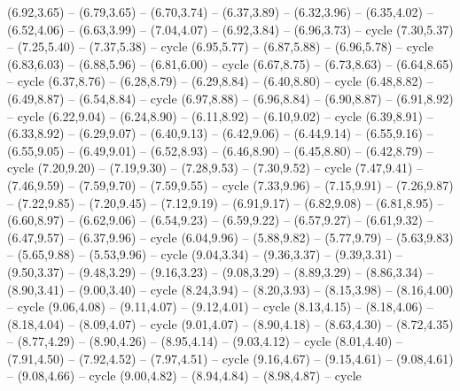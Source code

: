 {  (6.92,3.65) -- (6.79,3.65) -- (6.70,3.74) -- (6.37,3.89) -- (6.32,3.96) -- (6.35,4.02) -- (6.52,4.06) -- (6.63,3.99) -- (7.04,4.07) -- (6.92,3.84) -- (6.96,3.73) -- cycle
  (7.30,5.37) -- (7.25,5.40) -- (7.37,5.38) -- cycle
  (6.95,5.77) -- (6.87,5.88) -- (6.96,5.78) -- cycle
  (6.83,6.03) -- (6.88,5.96) -- (6.81,6.00) -- cycle
  (6.67,8.75) -- (6.73,8.63) -- (6.64,8.65) -- cycle
  (6.37,8.76) -- (6.28,8.79) -- (6.29,8.84) -- (6.40,8.80) -- cycle
  (6.48,8.82) -- (6.49,8.87) -- (6.54,8.84) -- cycle
  (6.97,8.88) -- (6.96,8.84) -- (6.90,8.87) -- (6.91,8.92) -- cycle
  (6.22,9.04) -- (6.24,8.90) -- (6.11,8.92) -- (6.10,9.02) -- cycle
  (6.39,8.91) -- (6.33,8.92) -- (6.29,9.07) -- (6.40,9.13) -- (6.42,9.06) -- (6.44,9.14) -- (6.55,9.16) -- (6.55,9.05) -- (6.49,9.01) -- (6.52,8.93) -- (6.46,8.90) -- (6.45,8.80) -- (6.42,8.79) -- cycle
  (7.20,9.20) -- (7.19,9.30) -- (7.28,9.53) -- (7.30,9.52) -- cycle
  (7.47,9.41) -- (7.46,9.59) -- (7.59,9.70) -- (7.59,9.55) -- cycle
  (7.33,9.96) -- (7.15,9.91) -- (7.26,9.87) -- (7.22,9.85) -- (7.20,9.45) -- (7.12,9.19) -- (6.91,9.17) -- (6.82,9.08) -- (6.81,8.95) -- (6.60,8.97) -- (6.62,9.06) -- (6.54,9.23) -- (6.59,9.22) -- (6.57,9.27) -- (6.61,9.32) -- (6.47,9.57) -- (6.37,9.96) -- cycle
  (6.04,9.96) -- (5.88,9.82) -- (5.77,9.79) -- (5.63,9.83) -- (5.65,9.88) -- (5.53,9.96) -- cycle
  (9.04,3.34) -- (9.36,3.37) -- (9.39,3.31) -- (9.50,3.37) -- (9.48,3.29) -- (9.16,3.23) -- (9.08,3.29) -- (8.89,3.29) -- (8.86,3.34) -- (8.90,3.41) -- (9.00,3.40) -- cycle
  (8.24,3.94) -- (8.20,3.93) -- (8.15,3.98) -- (8.16,4.00) -- cycle
  (9.06,4.08) -- (9.11,4.07) -- (9.12,4.01) -- cycle
  (8.13,4.15) -- (8.18,4.06) -- (8.18,4.04) -- (8.09,4.07) -- cycle
  (9.01,4.07) -- (8.90,4.18) -- (8.63,4.30) -- (8.72,4.35) -- (8.77,4.29) -- (8.90,4.26) -- (8.95,4.14) -- (9.03,4.12) -- cycle
  (8.01,4.40) -- (7.91,4.50) -- (7.92,4.52) -- (7.97,4.51) -- cycle
  (9.16,4.67) -- (9.15,4.61) -- (9.08,4.61) -- (9.08,4.66) -- cycle
  (9.00,4.82) -- (8.94,4.84) -- (8.98,4.87) -- cycle
}
